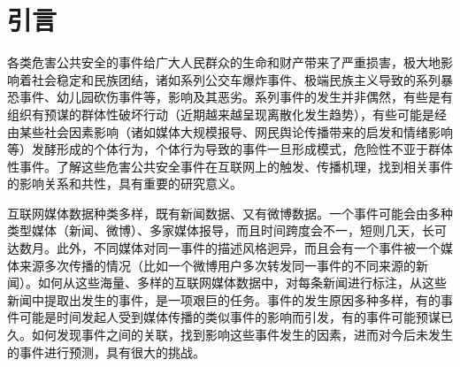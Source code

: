 \documentclass[a4paper,10pt]{article}
\newcommand{\sihao}{\fontsize{14pt}{\baselineskip}\selectfont}
\newcommand{\xiaowuhao}{\fontsize{9pt}{\baselineskip}\selectfont}
\begin{document}


\section{引言}

各类危害公共安全的事件给广大人民群众的生命和财产带来了严重损害，极大地影响着社会稳定和民族团结，诸如系列公交车爆炸事件、极端民族主义导致的系列暴恐事件、幼儿园砍伤事件等，影响及其恶劣。系列事件的发生并非偶然，有些是有组织有预谋的群体性破坏行动（近期越来越呈现离散化发生趋势），有些可能是经由某些社会因素影响（诸如媒体大规模报导、网民舆论传播带来的启发和情绪影响等）发酵形成的个体行为，个体行为导致的事件一旦形成模式，危险性不亚于群体性事件。了解这些危害公共安全事件在互联网上的触发、传播机理，找到相关事件的影响关系和共性，具有重要的研究意义。

互联网媒体数据种类多样，既有新闻数据、又有微博数据。一个事件可能会由多种类型媒体（新闻、微博）、多家媒体报导，而且时间跨度会不一，短则几天，长可达数月。此外，不同媒体对同一事件的描述风格迥异，而且会有一个事件被一个媒体来源多次传播的情况（比如一个微博用户多次转发同一事件的不同来源的新闻）。如何从这些海量、多样的互联网媒体数据中，对每条新闻进行标注，从这些新闻中提取出发生的事件，是一项艰巨的任务。事件的发生原因多种多样，有的事件可能是时间发起人受到媒体传播的类似事件的影响而引发，有的事件可能预谋已久。如何发现事件之间的关联，找到影响这些事件发生的因素，进而对今后未发生的事件进行预测，具有很大的挑战。
\end{document}
